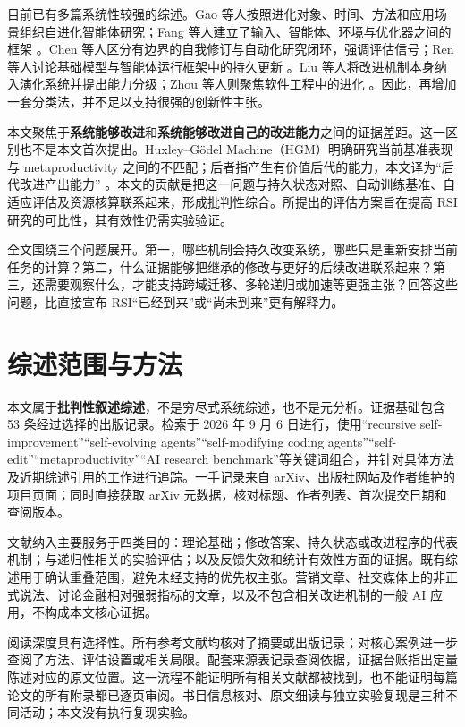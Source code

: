 \documentclass[11pt,,]{article}
\begin{document}
目前已有多篇系统性较强的综述。Gao
等人按照进化对象、时间、方法和应用场景组织自进化智能体研究；Fang
等人建立了输入、智能体、环境与优化器之间的框架
\citep{surveygao2025, surveyfang2025}。Chen
等人区分有边界的自我修订与自动化研究闭环，强调评估信号；Ren
等人讨论基础模型与智能体运行框架中的持久更新
\citep{surveychen2026, surveyren2026}。Liu
等人将改进机制本身纳入演化系统并提出能力分级；Zhou
等人则聚焦软件工程中的进化
\citep{surveyliu2026, surveycoding2026}。因此，再增加一套分类法，并不足以支持很强的创新性主张。

本文聚焦于\textbf{系统能够改进}和\textbf{系统能够改进自己的改进能力}之间的证据差距。这一区别也不是本文首次提出。Huxley--Gödel
Machine（HGM）明确研究当前基准表现与 metaproductivity
之间的不匹配；后者指产生有价值后代的能力，本文译为``后代改进产出能力''
\citep{hgm2025}。本文的贡献是把这一问题与持久状态对照、自动训练基准、自适应评估及资源核算联系起来，形成批判性综合。所提出的评估方案旨在提高
RSI 研究的可比性，其有效性仍需实验验证。

全文围绕三个问题展开。第一，哪些机制会持久改变系统，哪些只是重新安排当前任务的计算？第二，什么证据能够把继承的修改与更好的后续改进联系起来？第三，还需要观察什么，才能支持跨域迁移、多轮递归或加速等更强主张？回答这些问题，比直接宣布
RSI``已经到来''或``尚未到来''更有解释力。

\hypertarget{ux7efcux8ff0ux8303ux56f4ux4e0eux65b9ux6cd5}{%
\section{综述范围与方法}\label{ux7efcux8ff0ux8303ux56f4ux4e0eux65b9ux6cd5}}

本文属于\textbf{批判性叙述综述}，不是穷尽式系统综述，也不是元分析。证据基础包含
53 条经过选择的出版记录。检索于 2026 年 9 月 6 日进行，使用``recursive
self-improvement''``self-evolving agents''``self-modifying coding
agents''``self-edit''``metaproductivity''``AI research
benchmark''等关键词组合，并针对具体方法及近期综述引用的工作进行追踪。一手记录来自
arXiv、出版社网站及作者维护的项目页面；同时直接获取 arXiv
元数据，核对标题、作者列表、首次提交日期和查阅版本。

文献纳入主要服务于四类目的：理论基础；修改答案、持久状态或改进程序的代表机制；与递归性相关的实验评估；以及反馈失效和统计有效性方面的证据。既有综述用于确认重叠范围，避免未经支持的优先权主张。营销文章、社交媒体上的非正式说法、讨论金融相对强弱指标的文章，以及不包含相关改进机制的一般
AI 应用，不构成本文核心证据。

阅读深度具有选择性。所有参考文献均核对了摘要或出版记录；对核心案例进一步查阅了方法、评估设置或相关局限。配套来源表记录查阅依据，证据台账指出定量陈述对应的原文位置。这一流程不能证明所有相关文献都被找到，也不能证明每篇论文的所有附录都已逐页审阅。书目信息核对、原文细读与独立实验复现是三种不同活动；本文没有执行复现实验。
\end{document}
